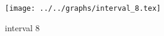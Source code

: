 \begin{figure}[h] \centering\texttt{[image: ../../graphs/interval\_8.tex]}\caption{interval 8}\label{gr:interval_8} \end{figure}
